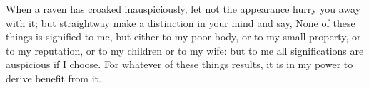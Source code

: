When a raven has croaked inauspiciously,  let not the appearance hurry you away
with it; but straightway make a distinction in your mind and say, None of these
things is signified to me, but either to my poor body, or to my small property,
or  to  my reputation,  or  to  my  children or  to  my  wife:  but to  me  all
significations  are  auspicious if  I  choose.  For  whatever of  these  things
results, it is in my power to derive benefit from it.

